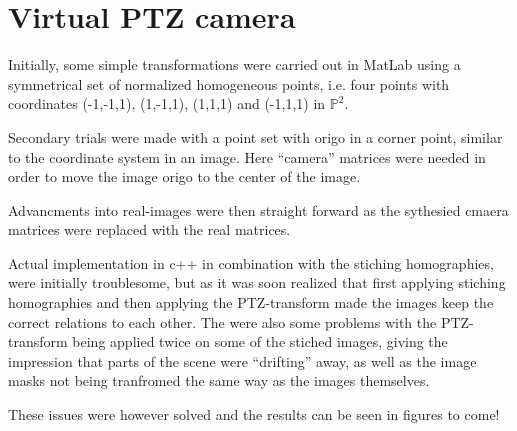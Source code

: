 \section{Virtual PTZ camera}
Initially, some simple transformations were carried out in MatLab using a symmetrical set of normalized homogeneous points, i.e. four points with coordinates (-1,-1,1), (1,-1,1), (1,1,1) and (-1,1,1) in $\mathbb{P}^2$. 

Secondary trials were made with a point set with origo in a corner point, similar to the coordinate system in an image. Here ``camera'' matrices were needed in order to move the image origo to the center of the image. 

Advancments into real-images were then straight forward as the sythesied cmaera matrices were replaced with the real matrices. 

Actual implementation in c++ in combination with the stiching homographies, were initially troublesome, but as it was soon realized that first applying stiching homographies and then applying the PTZ-transform made the images keep the correct relations to each other. The were also some problems with the PTZ-transform being applied twice on some of the stiched images, giving the impression that parts of the scene were ``drifting'' away, as well as the image masks not being tranfromed the same way as the images themselves.

These issues were however solved and the results can be seen in figures to come!
